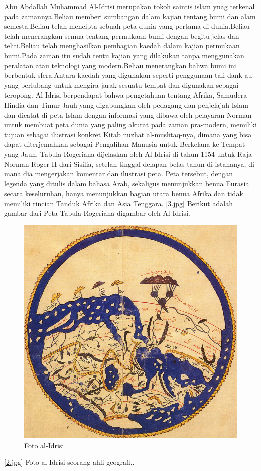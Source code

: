 	Abu Abdallah Muhammad Al-Idrisi merupakan tokoh saintis islam ynag terkenal pada zamannya.Beliau memberi sumbangan dalam kajian tentang bumi dan alam semesta.Beliau telah mencipta sebuah peta dunia yang pertama di dunia.Beliau telah menerangkan semua tentang permukaan bumi dengan begitu jelas dan teliti.Beliau telah menghasilkan pembagian kaedah dalam kajian permukaan bumi.Pada zaman itu sudah tentu kajian yang dilakukan tanpa menggunakan peralatan atau teknologi yang modern.Beliau menerangkan bahwa bumi ini berbentuk sfera.Antara kaedah yang digunakan seperti penggunaan tali dank au yang berlubang untuk mengira jarak sesuatu tempat dan digunakan sebagai teropong.
	Al-Idrisi berpendapat bahwa pengetahuan tentang Afrika, Samudera Hindia dan Timur Jauh yang digabungkan oleh pedagang dan penjelajah Islam dan dicatat di peta Islam dengan informasi yang dibawa oleh pelayaran Norman untuk membuat peta dunia yang paling akurat pada zaman pra-modern, memiliki tujuan sebagai ilustrasi konkret Kitab nuzhat al-mushtaq-nya, dimana yang bisa dapat diterjemahkan sebagai Pengalihan Manusia untuk Berkelana ke Tempat yang Jauh. 
	Tabula Rogeriana dijelaskan oleh Al-Idrisi di tahun 1154 untuk Raja Norman Roger II dari Sisilia, setelah tinggal delapan belas tahun di istananya, di mana dia mengerjakan komentar dan ilustrasi peta. Peta tersebut, dengan legenda yang ditulis dalam bahasa Arab, sekaligus menunjukkan benua Eurasia secara keseluruhan, hanya menunjukkan bagian utara benua Afrika dan tidak memiliki rincian Tanduk Afrika dan Asia Tenggara.
	\ref{3.jpg} Berikut adalah gambar dari Peta Tabula Rogeriana digambar oleh Al-Idrisi.
	\begin{figure} [ht]
	\centerline{\includegraphics[width=1\textwidth]{figures/1.jpg}}
	\caption{Foto al-Idrisi}
	\end{figure}
	\ref{2.jpg} Foto al-Idrisi seorang ahli geografi,.
	

